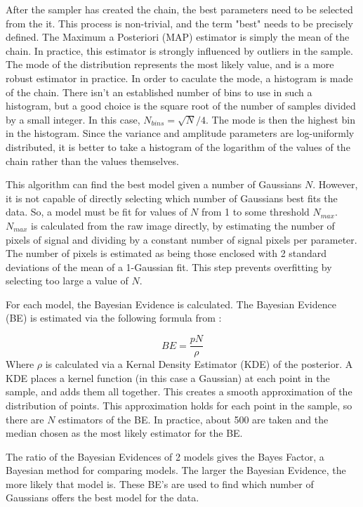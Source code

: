 \documentclass[authoryear, 12pt, 5p, times]{elsarticle}
\begin{document}
After the sampler has created the chain, the best parameters need to be selected from the it. This process is non-trivial, and the term "best" needs to be precisely defined. The Maximum a Posteriori (MAP) estimator is simply the mean of the chain. In practice, this estimator is strongly influenced by outliers in the sample. The mode of the distribution represents the most likely value, and is a more robust estimator in practice. In order to caculate the mode, a histogram is made of the chain. There isn't an established number of bins to use in such a histogram, but a good choice is the square root of the number of samples divided by a small integer. In this case, $N_{bins} = \sqrt{N}/4$. The mode is then the highest bin in the histogram. Since the variance and amplitude parameters are log-uniformly distributed, it is better to take a histogram of the logarithm of the values of the chain rather than the values themselves. 

This algorithm can find the best model given a number of Gaussians $N$. However, it is not capable of directly selecting which number of Gaussians best fits the data. So, a model must be fit for values of $N$ from 1 to some threshold $N_{max}$. $N_{max}$ is calculated from the raw image directly, by estimating the number of pixels of signal and dividing by a constant number of signal pixels per parameter. The number of pixels is estimated as being those enclosed with 2 standard deviations of the mean of a 1-Gaussian fit. This step prevents overfitting by selecting too large a value of $N$. 

For each model, the Bayesian Evidence is calculated. The Bayesian Evidence (BE) is estimated via the following formula from \cite{astroMLText}:

\begin{equation}
BE = \frac{pN}{\rho}
\end{equation}
Where $\rho$ is calculated via a Kernal Density Estimator (KDE) of the posterior. A KDE places a kernel function (in this case a Gaussian) at each point in the sample, and adds them all together. This creates a smooth approximation of the distribution of points. This approximation holds for each point in the sample, so there are $N$ estimators of the BE. In practice, about 500 are taken and the median chosen as the most likely estimator for the BE. 

The ratio of the Bayesian Evidences of 2 models gives the Bayes Factor, a Bayesian method for comparing models. The larger the Bayesian Evidence, the more likely that model is. These BE's are used to find which number of Gaussians offers the best model for the data. 
\end{document}
